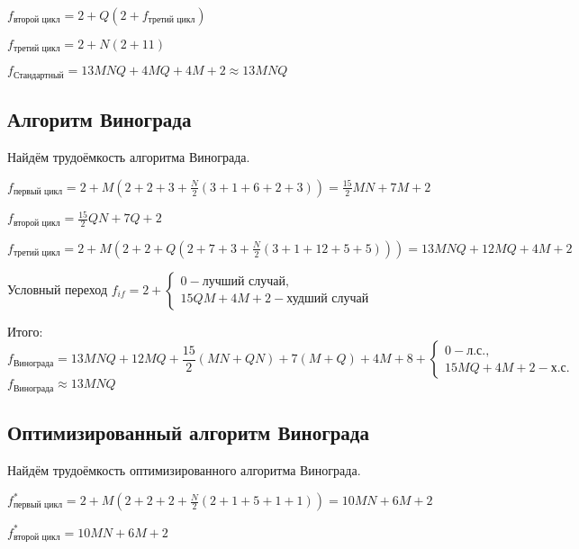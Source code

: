             $ f_\text{второй цикл} = 2 + Q(2 + f_\text{третий цикл})$  

            $ f_\text{третий цикл} = 2 + N(2 + 11)$  

            $ f_\text{Стандартный} = 13MNQ + 4MQ + 4M + 2 \approx 13MNQ$

        \subsection{Алгоритм Винограда}
            Найдём трудоёмкость алгоритма Винограда.
            
            $ f_\text{первый цикл} = 2 + M(2 + 2 + 3 + \frac{N}{2}(3 + 1 + 6 + 2 + 3)) = \frac{15}{2}MN + 7M + 2$
            
            $ f_\text{второй цикл} = \frac{15}{2}QN + 7Q + 2$

            $ f_\text{третий цикл} = 2 + M(2 + 2 + Q(2 + 7 + 3 + \frac{N}{2}(3 + 1 + 12 + 5 + 5))) = 13MNQ + 12MQ + 4M + 2$

            Условный переход $f_{if} = 2 + \left\{
                \begin{matrix}
                0 - \text{лучший случай},\\
                15QM + 4M + 2 - \text{худший случай} 
                \end{matrix}\right.$

            Итого:
            \begin{equation}
                f_\text{Винограда} = 13MNQ + 12MQ + \frac{15}{2}(MN + QN) + 7(M + Q) + 4M + 8 + 
                    \left\{ \begin{matrix}
                    0 - \text{л.с.},\\
                    15MQ + 4M + 2 - \text{х.с.} 
                    \end{matrix}\right.
            \end{equation}
            $ f_\text{Винограда} \approx 13MNQ $
        \subsection{Оптимизированный алгоритм Винограда}

            Найдём трудоёмкость оптимизированного алгоритма Винограда.
                
            $ f_\text{первый цикл}^* = 2 + M(2 + 2 + 2 + \frac{N}{2}(2 + 1 + 5 + 1 + 1)) = 10MN + 6M + 2$
            
            $ f_\text{второй цикл}^* = 10MN + 6M + 2$

